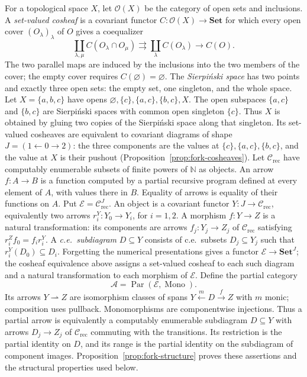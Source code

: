 \documentclass[11pt]{article}
\newcommand{\N}{\mathbb N}
\begin{document}
For a topological space $X$, let $\mathcal O(X)$ be the category
of open sets and inclusions. A \emph{set-valued cosheaf} is a
covariant functor $C:\mathcal O(X)\to\mathbf{Set}$ for which
every open cover $(O_\lambda)_\lambda$ of $O$ gives a coequalizer
\[
 \coprod_{\lambda,\mu} C(O_\lambda\cap O_\mu)
 \rightrightarrows \coprod_\lambda C(O_\lambda)
 \longrightarrow C(O).
\]
The two parallel maps are induced by the inclusions into the two
members of the cover; the empty cover requires
$C(\varnothing)=\varnothing$.
The \emph{Sierpi\'nski space} has two points and exactly three open
sets: the empty set, one singleton, and the whole space.
Let $X=\{a,b,c\}$ have opens
$\varnothing,\{c\},\{a,c\},\{b,c\},X$.
The open subspaces $\{a,c\}$ and $\{b,c\}$ are Sierpi\'nski spaces
with common open singleton $\{c\}$. Thus $X$ is obtained by gluing
two copies of the Sierpi\'nski space along that singleton.
Its set-valued cosheaves are equivalent to covariant diagrams of shape
$J=(1\leftarrow0\to2)$: the three components are the values at
$\{c\},\{a,c\},\{b,c\}$, and the value at $X$ is their pushout
(Proposition~\ref{prop:fork-cosheaves}).
Let $\mathcal C_{\mathrm{rec}}$ have computably enumerable subsets
of finite powers of $\N$ as objects. An arrow $f:A\to B$ is a
function computed by a partial recursive program defined at every
element of $A$, with values there in $B$. Equality of arrows is
equality of their functions on $A$.
Put $\mathcal E=\mathcal C_{\mathrm{rec}}^J$.
An object is a covariant functor $Y:J\to\mathcal C_{\mathrm{rec}}$,
equivalently two arrows $r_i^Y:Y_0\to Y_i$, for $i=1,2$.
A morphism $f:Y\to Z$ is a natural transformation: its components
are arrows $f_j:Y_j\to Z_j$ of $\mathcal C_{\mathrm{rec}}$ satisfying
$r_i^Zf_0=f_i r_i^Y$.
A \emph{c.e.\ subdiagram} $D\subseteq Y$ consists of c.e.\ subsets
$D_j\subseteq Y_j$ such that $r_i^Y(D_0)\subseteq D_i$.
Forgetting the numerical presentations gives a functor
$\mathcal E\to\mathbf{Set}^J$; the cosheaf equivalence above assigns
a set-valued cosheaf to each such diagram and a natural transformation
to each morphism of $\mathcal E$.
Define the partial category
\[
 \mathcal A=\operatorname{Par}(\mathcal E,\operatorname{Mono}).
\]
Its arrows $Y\rightharpoonup Z$ are isomorphism classes of spans
$Y\xleftarrow{m}D\xrightarrow{f}Z$ with $m$ monic; composition
uses pullback. Monomorphisms are componentwise injections.
Thus a partial arrow is equivalently a computably enumerable
subdiagram $D\subseteq Y$ with arrows $D_j\to Z_j$ of
$\mathcal C_{\mathrm{rec}}$ commuting with the transitions. Its
restriction is the partial identity on $D$, and its range is the
partial identity on the subdiagram of component images.
Proposition~\ref{prop:fork-structure} proves these assertions and
the structural properties used below.
\end{document}

